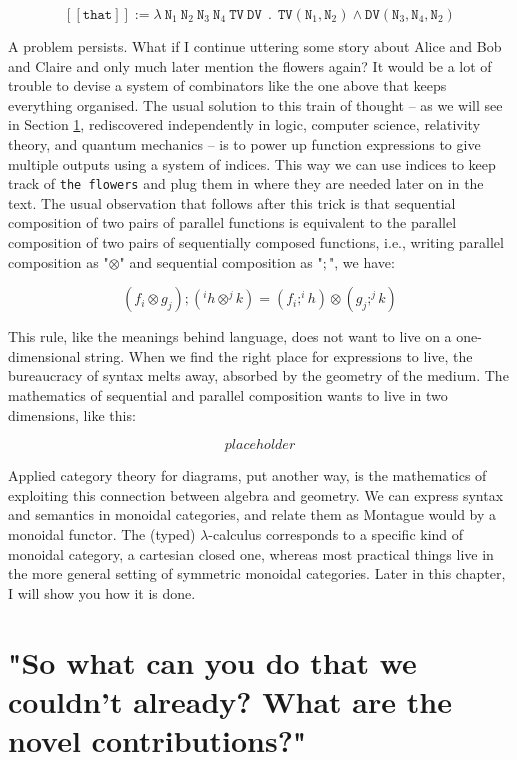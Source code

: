 \[ [\![ \texttt{that} ]\!] := \lambda \ \texttt{N}_1 \ \texttt{N}_2 \ \texttt{N}_3 \ \texttt{N}_4 \ \texttt{TV} \ \texttt{DV} \ \ . \ \ \texttt{TV}(\texttt{N}_1,\texttt{N}_2) \wedge \texttt{DV}(\texttt{N}_3,\texttt{N}_4,\texttt{N}_2) \]

A problem persists. What if I continue uttering some story about Alice and Bob and Claire and only much later mention the flowers again? It would be a lot of trouble to devise a system of combinators like the one above that keeps everything organised. The usual solution to this train of thought -- as we will see in Section \ref{}, rediscovered independently in logic, computer science, relativity theory, and quantum mechanics -- is to power up function expressions to give multiple outputs using a system of indices. This way we can use indices to keep track of \texttt{the flowers} and plug them in where they are needed later on in the text. The usual observation that follows after this trick is that sequential composition of two pairs of parallel functions is equivalent to the parallel composition of two pairs of sequentially composed functions, i.e., writing parallel composition as "$\otimes$" and sequential composition as "$;$", we have:

\[(f_i \otimes g_j) ; (^{i}h \otimes ^{j}k) = (f_i ; ^{i}h) \otimes (g_j ; ^{j}k)\]

This rule, like the meanings behind language, does not want to live on a one-dimensional string. When we find the right place for expressions to live, the bureaucracy of syntax melts away, absorbed by the geometry of the medium. The mathematics of sequential and parallel composition wants to live in two dimensions, like this:

\[placeholder\]

Applied category theory for diagrams, put another way, is the mathematics of exploiting this connection between algebra and geometry. We can express syntax and semantics in monoidal categories, and relate them as Montague would by a monoidal functor. The (typed) $\lambda$-calculus corresponds to a specific kind of monoidal category, a cartesian closed one, whereas most practical things live in the more general setting of symmetric monoidal categories. Later in this chapter, I will show you how it is done.

\section{"So what can you do that we couldn't already? What are the novel contributions?"}

